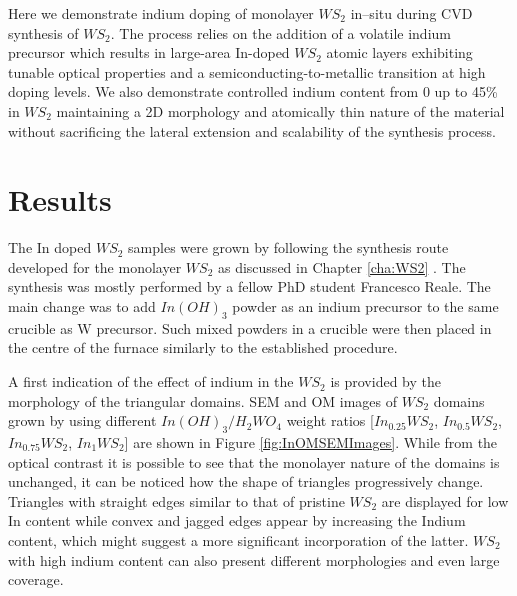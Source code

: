 Here we demonstrate indium doping of monolayer $WS_2$ in–situ during CVD synthesis of $WS_2$. The process relies on the addition of a volatile indium precursor which results in large-area In-doped $WS_2$ atomic layers exhibiting tunable optical properties and a semiconducting-to-metallic transition at high doping levels. We also demonstrate controlled indium content from 0 up to 45\% in $WS_2$ maintaining a 2D morphology and atomically thin nature of the material without sacrificing the lateral extension and scalability of the synthesis process.

\section{Results}

The In doped $WS_2$ samples were grown by following the synthesis route developed for the monolayer $WS_2$ as discussed in Chapter \ref{cha:WS2} \cite{Reale2017}. The synthesis was mostly performed by a fellow PhD student Francesco Reale. The main change was to add $In(OH)_3$ powder as an indium precursor to the same crucible as W precursor. Such mixed powders in a crucible were then placed in the centre of the furnace similarly to the established procedure.

A first indication of the effect of indium in the $WS_2$ is provided by the morphology of the triangular domains. SEM and OM images of $WS_2$ domains grown by using different $In(OH)_3/H_2WO_4$ weight ratios [$In_{0.25}WS_2$, $In_{0.5}WS_2$, $In_{0.75}WS_2$, $In_1WS_2$] are shown in Figure \ref{fig:InOMSEMImages}. While from the optical contrast it is possible to see that the monolayer nature of the domains is unchanged, it can be noticed how the shape of triangles progressively change. Triangles with straight edges similar to that of pristine $WS_2$ are displayed for low In content while convex and jagged edges appear by increasing the Indium content, which might suggest a more significant incorporation of the latter. $WS_2$ with high indium content can also present different morphologies and even large coverage.

